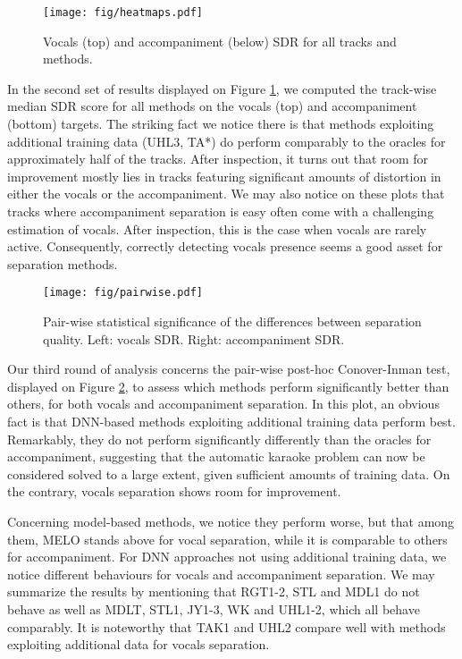 \documentclass{article}
\begin{document}
\begin{figure}
  \begin{center}
     \texttt{[image: fig/heatmaps.pdf]}
  \end{center}
  \caption{Vocals (top) and accompaniment (below) SDR for all tracks and methods.}
  \label{fig:trackwise_scores}
\end{figure}

In the second set of results displayed on Figure \ref{fig:trackwise_scores}, we computed the track-wise median SDR score for all methods on the vocals (top) and accompaniment (bottom) targets. The striking fact we notice there is that methods exploiting additional training data (UHL3, TA*) do perform comparably to the oracles for approximately half of the tracks. After inspection, it turns out that room for improvement mostly lies in tracks featuring significant amounts of distortion in either the vocals or the accompaniment. We may also notice on these plots that tracks where accompaniment separation is easy often come with a challenging estimation of vocals. After inspection, this is the case when vocals are rarely active. Consequently, correctly detecting vocals presence seems a good asset for separation methods.

\begin{figure}[h]
  \begin{center}
     \texttt{[image: fig/pairwise.pdf]}
  \end{center}
  \caption{Pair-wise statistical significance of the differences between separation quality. Left: vocals SDR. Right: accompaniment SDR.}
  \label{fig:pairwise_matrix}
\end{figure}

Our third round of analysis concerns the pair-wise post-hoc Conover-Inman test, displayed on Figure \ref{fig:pairwise_matrix}, to assess which methods perform significantly better than others, for both vocals and accompaniment separation. In this plot, an obvious fact is that DNN-based methods exploiting additional training data perform best. Remarkably, they do not perform significantly differently than the oracles for accompaniment, suggesting that the automatic karaoke problem can now be considered solved to a large extent, given sufficient amounts of training data. On the contrary, vocals separation shows room for improvement.

Concerning model-based methods, we notice they perform worse, but that among them, MELO stands above for vocal separation, while it is comparable to others for accompaniment. For DNN approaches not using additional training data, we notice different behaviours for vocals and accompaniment separation. We may summarize the results by mentioning that RGT1-2, STL and MDL1 do not behave as well as MDLT, STL1, JY1-3, WK and UHL1-2, which all behave comparably. It is noteworthy that TAK1 and UHL2 compare well with methods exploiting additional data for vocals separation.
\end{document}
